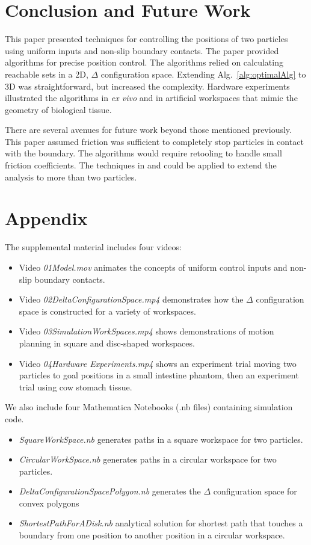 \section{Conclusion and Future Work}\label{sec:conclusion}

This paper presented techniques for controlling the positions of two particles using uniform inputs and non-slip boundary contacts.  
The paper provided algorithms for precise position control. The algorithms relied on calculating reachable sets in a 2D, $\Delta$ configuration space.
Extending Alg.~\ref{alg:optimalAlg}  to 3D was straightforward, but increased the complexity.
Hardware experiments illustrated the algorithms in \emph{ex vivo} and in artificial workspaces that mimic the geometry of biological tissue.

There are several avenues for future work beyond those mentioned previously. This paper assumed friction was sufficient to completely stop particles in contact with the boundary. 
  The algorithms would require retooling to handle small friction coefficients. The techniques in \cite{shahrokhi2017algorithms} and  \cite{AaronManipulation2013} could be applied to extend the analysis to more than two particles.
  
  \section*{Appendix}\label{sec:appendix}
 The supplemental material includes four videos:
  	\begin{itemize}	 
 \item Video  \emph{01Model.mov} animates the concepts of uniform control inputs and non-slip boundary contacts.
 \item Video  \emph{02DeltaConfigurationSpace.mp4} demonstrates how the $\Delta$ configuration space is constructed for a variety of workspaces.
 \item Video  \emph{03SimulationWorkSpaces.mp4} shows demonstrations of motion planning in square and disc-shaped workspaces. 
 \item Video  \emph{04Hardware Experiments.mp4} shows an experiment trial moving two particles to goal positions in a small intestine phantom, then an experiment trial using cow stomach tissue.
		\end{itemize}	 	
We also include four  Mathematica Notebooks (.nb files) containing simulation code.  
		   	\begin{itemize}	 
 \item   \emph{SquareWorkSpace.nb} generates paths in a square workspace for two particles.
 \item  \emph{CircularWorkSpace.nb} generates paths in a circular workspace for two particles.
 \item   \emph{DeltaConfigurationSpacePolygon.nb} generates the $\Delta$ configuration space for convex polygons
  \item   \emph{ShortestPathForADisk.nb} analytical solution for shortest path that touches a boundary from one position to another position in a circular workspace.
		\end{itemize}	 
		   
